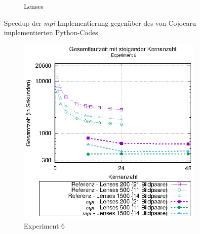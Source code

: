 \begin{center}
\begin{figure}[htbp]
\begin{subfigure}[b]{0.45\textwidth}
			\caption{Lenses}
			\label{fig:mpi_speedup_lenses}
		\end{subfigure}
		\caption{Speedup der \textit{mpi} Implementierung gegenüber des von Cojocaru implementierten Python-Codes}
		\label{fig:mpi_speedup}
	\end{figure}
\end{center}

\begin{center}
	\begin{figure}[htbp]
		\begin{subfigure}[b]{0.45\textwidth}
			\centering
			\includegraphics[width=\textwidth]{pdf/mpi_times_exp6}
			\caption{Experiment 6}
			\label{fig:mpi_times_exp6}
		\end{subfigure}
		\hfill
		\begin{subfigure}[b]{0.45\textwidth}
			\centering

\end{subfigure}
\end{figure}
\end{center}
